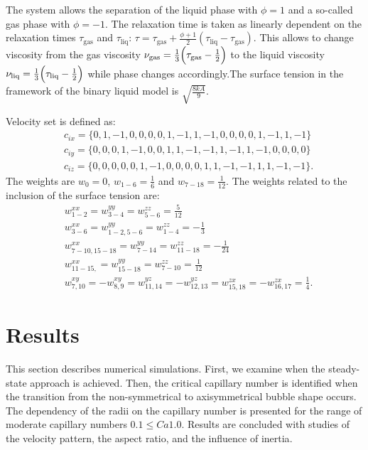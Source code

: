 \documentclass{article}
\begin{document}
The system allows the separation of the liquid
phase with $\phi=1$ and a so-called gas phase with $\phi=-1$. The
relaxation time is taken as linearly dependent on the relaxation
times $\tau_{\mathrm{gas}}$ and $\tau_{\mathrm{liq}}$:
$\tau=\tau_{\mathrm{gas}}+\frac{\phi+1}{2}(\tau_{\mathrm{liq}}-\tau_{\mathrm{gas}})$. This allows
to change viscosity from the gas viscosity
$\nu_{\mathrm{gas}}=\frac{1}{3}\Bigl(\tau_{\mathrm{gas}}-\frac{1}{2}\Bigr)$ to the liquid viscosity
$\nu_{\mathrm{liq}}=\frac{1}{3}\Bigl(\tau_{\mathrm{liq}}-\frac{1}{2}\Bigr)$ while phase changes
accordingly.The surface tension in the framework of the binary liquid model is $\sqrt{\frac{8 k
A}{9}}$.

Velocity set is defined as:
\begin{equation} 
\begin{aligned}
&c_{ix}=\{0,1,-1,0, 0,0, 0,1,-1, 1,-1,0, 0, 0, 0,1,-1, 1,-1\}\\
&c_{iy}=\{0,0, 0,1,-1,0, 0,1, 1,-1,-1,1,-1, 1,-1,0, 0, 0, 0\}\\
&c_{iz}=\{0,0, 0,0, 0,1,-1,0, 0, 0, 0,1, 1,-1,-1,1, 1,-1,-1\}.
\end{aligned}
\end{equation}
The weights are $w_0=0$, $w_{1-6}=\frac{1}{6}$ and $w_{7-18}=\frac{1}{12}$. The weights
related to the inclusion of the surface tension are:
\begin{equation}
\begin{aligned}
&w^{xx}_{1-2}=w^{yy}_{3-4}=w^{zz}_{5-6}=\frac{5}{12}\\
&w^{xx}_{3-6}=w^{yy}_{1-2,5-6}=w^{zz}_{1-4}=-\frac{1}{3}\\
&w^{xx}_{7-10,15-18}=w^{yy}_{7-14}=w^{zz}_{11-18}=-\frac{1}{24}\\
&w^{xx}_{11-15,}=w^{yy}_{15-18}=w^{zz}_{7-10}=\frac{1}{12}\\
&w^{xy}_{7,10}=-w^{xy}_{8,9}=w^{yz}_{11,14}=-w^{yz}_{12,13}=w^{zx}_{15,18}=-w^{zx}_{16,17}=\frac{1}{
4}.
\end{aligned}
\end{equation}


\section{Results}
\label{sec:results}
This section describes numerical simulations. First, we examine when the steady-state approach is
achieved. Then, the critical capillary number is identified when the transition from the
non-symmetrical to axisymmetrical bubble shape occurs. The dependency of the radii on the capillary
number is presented for the range of moderate capillary numbers $0.1 \leq Ca 1.0$. Results are
concluded with studies of the velocity pattern,{\color{red} the aspect ratio, and the influence of
inertia}.
\end{document}
